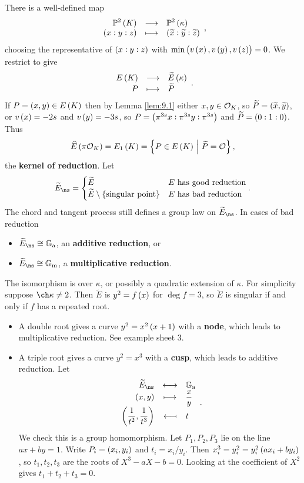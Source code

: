 There is a well-defined map
$$ \function{\PP^2\br{K}}{\PP^2\br{\kappa}}{\br{x : y : z}}{\br{\widetilde{x} : \widetilde{y} : \widetilde{z}}}, $$
choosing the representative of $ \br{x : y : z} $ with $ \min\br{v\br{x}, v\br{y}, v\br{z}} = 0 $. We restrict to give
$$ \function{E\br{K}}{\widetilde{E}\br{\kappa}}{P}{\widetilde{P}}. $$
If $ P = \br{x, y} \in E\br{K} $ then by Lemma \ref{lem:9.1} either $ x, y \in \mathcal{O}_K $, so $ \widetilde{P} = \br{\widetilde{x}, \widetilde{y}} $, or $ v\br{x} = -2s $ and $ v\br{y} = -3s $, so $ P = \br{\pi^{3s}x : \pi^{3s}y : \pi^{3s}} $ and $ \widetilde{P} = \br{0 : 1 : 0} $. Thus
$$ \widehat{E}\br{\pi\OOO_K} = E_1\br{K} = \cbr{P \in E\br{K} \st \widetilde{P} = \OOO}, $$
the \textbf{kernel of reduction}. Let
$$ \widetilde{E}_{\ns} =
\begin{cases}
\widetilde{E} & E \ \text{has good reduction} \\
\widetilde{E} \setminus \cbr{\text{singular point}} & E \ \text{has bad reduction}
\end{cases}.
$$
The chord and tangent process still defines a group law on $ \widetilde{E}_{\ns} $. In cases of bad reduction
\begin{itemize}
\item $ \widetilde{E}_{\ns} \cong \GG_\a $, an \textbf{additive reduction}, or
\item $ \widetilde{E}_{\ns} \cong \GG_\m $, a \textbf{multiplicative reduction}.
\end{itemize}
The isomorphism is over $ \kappa $, or possibly a quadratic extension of $ \kappa $. For simplicity suppose $ \ch \kappa \ne 2 $. Then $ \widetilde{E} $ is $ y^2 = f\br{x} $ for $ \deg f = 3 $, so $ \widetilde{E} $ is singular if and only if $ f $ has a repeated root.
\begin{itemize}
\item A double root gives a curve $ y^2 = x^2\br{x + 1} $ with a \textbf{node}, which leads to multiplicative reduction. See example sheet $ 3 $.
\item A triple root gives a curve $ y^2 = x^3 $ with a \textbf{cusp}, which leads to additive reduction. Let
$$ \bijection{\widetilde{E}_{\ns}}{\GG_\a}{\br{x, y}}{\dfrac{x}{y}}{\br{\dfrac{1}{t^2}, \dfrac{1}{t^3}}}{t}. $$
We check this is a group homomorphism. Let $ P_1, P_2, P_3 $ lie on the line $ ax + by = 1 $. Write $ P_i = \br{x_i, y_i} $ and $ t_i = x_i / y_i $. Then $ x_i^3 = y_i^2 = y_i^2\br{ax_i + by_i} $, so $ t_1, t_2, t_3 $ are the roots of $ X^3 - aX - b = 0 $. Looking at the coefficient of $ X^2 $ gives $ t_1 + t_2 + t_3 = 0 $.
\end{itemize}

